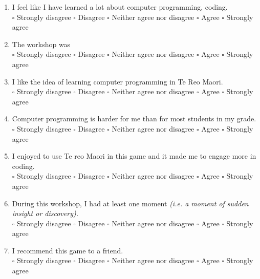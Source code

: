 \documentclass[12pt]{article}\pagestyle{myheadings}
\theoremstyle{plain}
\begin{document}
\begin{mdframed}

\begin{enumerate}


\item I feel like I have learned a lot about computer programming, coding. \\
$\square$ Strongly disagree $\square$ Disagree $\square$ Neither agree nor disagree $\square$ Agree $\square$ Strongly agree


\item The workshop was \\
$\square$ Strongly disagree $\square$ Disagree $\square$ Neither agree nor disagree $\square$ Agree $\square$ Strongly agree

\item I like the idea of learning computer programming in Te Reo Maori.\\
$\square$ Strongly disagree $\square$ Disagree $\square$ Neither agree nor disagree $\square$ Agree $\square$ Strongly agree


\item Computer programming is harder for me than for most students in my grade.\\
$\square$ Strongly disagree $\square$ Disagree $\square$ Neither agree nor disagree $\square$ Agree $\square$ Strongly agree











\item I enjoyed to use Te reo Maori in this game and it made me to engage more in coding. \\
$\square$ Strongly disagree $\square$ Disagree $\square$ Neither agree nor disagree $\square$ Agree $\square$ Strongly agree

\item During this workshop, I had at least one  moment \textit{(i.e. a moment of sudden insight or discovery).} \\
$\square$ Strongly disagree $\square$ Disagree $\square$ Neither agree nor disagree $\square$ Agree $\square$ Strongly agree

\item I recommend this game to a friend. \\
$\square$ Strongly disagree $\square$ Disagree $\square$ Neither agree nor disagree $\square$ Agree $\square$ Strongly agree
\end{enumerate}
\end{mdframed}
\end{document}
